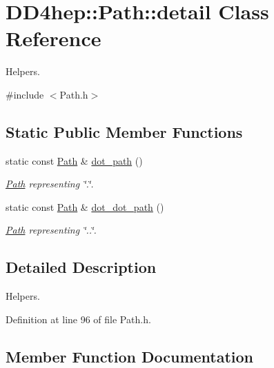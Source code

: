 \hypertarget{class_d_d4hep_1_1_path_1_1detail}{}\section{D\+D4hep\+:\+:Path\+:\+:detail Class Reference}
\label{class_d_d4hep_1_1_path_1_1detail}


Helpers.  




{\ttfamily \#include $<$Path.\+h$>$}

\subsection*{Static Public Member Functions}
\begin{DoxyCompactItemize}
\item 
static const \hyperlink{class_d_d4hep_1_1_path}{Path} \& \hyperlink{class_d_d4hep_1_1_path_1_1detail_ab5518d01c92d39c37cb48ad8ffeb5aa5}{dot\+\_\+path} ()
\begin{DoxyCompactList}\small\item\em \hyperlink{class_d_d4hep_1_1_path}{Path} representing \char`\"{}.\char`\"{}. \end{DoxyCompactList}\item 
static const \hyperlink{class_d_d4hep_1_1_path}{Path} \& \hyperlink{class_d_d4hep_1_1_path_1_1detail_aa0c12c175ecacc65564503611c576038}{dot\+\_\+dot\+\_\+path} ()
\begin{DoxyCompactList}\small\item\em \hyperlink{class_d_d4hep_1_1_path}{Path} representing \char`\"{}..\char`\"{}. \end{DoxyCompactList}\end{DoxyCompactItemize}


\subsection{Detailed Description}
Helpers. 

Definition at line 96 of file Path.\+h.



\subsection{Member Function Documentation}
\hypertarget{class_d_d4hep_1_1_path_1_1detail_aa0c12c175ecacc65564503611c576038}{}\label{class_d_d4hep_1_1_path_1_1detail_aa0c12c175ecacc65564503611c576038} 
